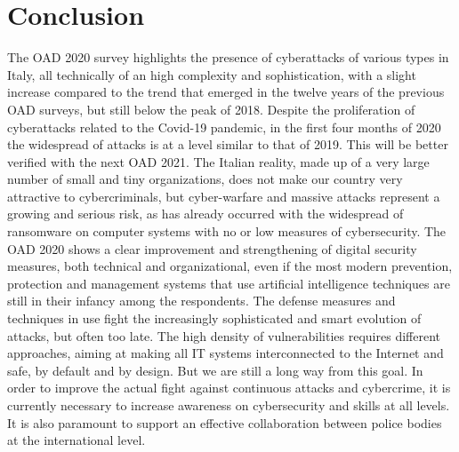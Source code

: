\documentclass{easychair}
\begin{document}
\section{Conclusion}\label{sec:Conclusion}

The OAD 2020 survey highlights the presence of cyberattacks of various types in Italy, all technically of an high complexity and sophistication, with a slight increase 
compared to the trend that emerged in the twelve years of the previous OAD surveys, but still below the peak of 2018. Despite the proliferation of cyberattacks
related to the Covid-19 pandemic, in the first four months of 2020 the widespread of attacks is at a level similar to that of 2019. This will be better verified
with the next OAD 2021. The Italian reality, made up of a very large number of small and tiny organizations, does not make our country very attractive to cybercriminals, but cyber-warfare
and massive attacks represent a growing and serious risk, as has already occurred with the widespread of ransomware on computer systems with no or low
measures of cybersecurity. The OAD 2020 shows a clear improvement and strengthening of digital security measures, both technical and organizational, even if the most modern 
prevention, protection and management systems that use artificial intelligence techniques are still in their infancy among the respondents. The defense measures and techniques 
in use fight the increasingly sophisticated and smart evolution of attacks, but often too late. The high density of vulnerabilities 
requires different approaches, aiming at making all IT systems interconnected to the Internet and safe, by default and by design. But we are 
still a long way from this goal. In order to improve the actual fight against continuous attacks and cybercrime, it is currently necessary to increase 
awareness on cybersecurity and skills at all levels. It is also paramount to support an effective collaboration between police bodies at the international level.



\end{document}

